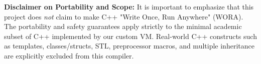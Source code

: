 \documentclass[12pt, a4paper]{article}
\begin{document}
\textbf{Disclaimer on Portability and Scope:} It is important to emphasize that this project does \emph{not} claim to make C++ "Write Once, Run Anywhere" (WORA). The portability and safety guarantees apply strictly to the minimal academic subset of C++ implemented by our custom VM. Real-world C++ constructs such as templates, classes/structs, STL, preprocessor macros, and multiple inheritance are explicitly excluded from this compiler.
\end{document}
